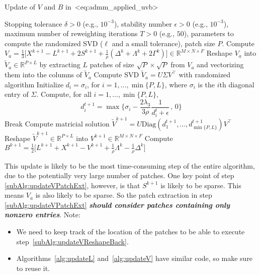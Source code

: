 \documentclass[a4paper,11pt]{article}
\def\eqref#1{<#1>}%
\begin{document}
\begin{algorithm}
  \caption{Update of $V$ and $B$ in~\eqref{eq:admm_applied_uvb}}
  \label{alg:updateV}
  \begin{algorithmic}[1]
  \algrenewcommand{}
  \Require Stopping tolerance $\delta > 0$ (e.g., $10^{-3}$), stability number $\epsilon > 0$ (e.g., $10^{-3}$), maximum number of
  reweighting iterations $T > 0$ (e.g., $50$), parameters to compute the
  randomized SVD ($\ell$ and a small tolerance), patch size $P$.
  \State Compute 
  $ V_a = 
  \frac{1}{3}
  \Big[
    X^{k+1} - L^{k+1}
    +
    2S^{k+1}
    +
  \frac{1}{\rho}(\Delta^k + \Lambda^k + 2\Gamma^{k})\Big]
    \in \mathbb{R}^{M\times N\times F}$
  \State Reshape $V_a$ into $\widetilde{V}_a \in \mathbb{R}^{P \times L}$ by
  extracting $L$ patches of size $\sqrt{P} \times \sqrt{P}$ from $V_a$ and vectorizing
  them into the columns of $\widetilde{V}_a$
  \label{subAlg:updateVPatchExt}
  \State Compute SVD $\widetilde{V}_a = U \Sigma V^\top$ with randomized
  algorithm
  \State Initialize $d_i = \sigma_i$, for $i = 1, \ldots, \min\{P, L\}$, where
  $\sigma_i$ is the $i$th diagonal entry of $\Sigma$.
    \State Compute, for all $i = 1, \ldots, \min\{P, L\}$, 
    $$
    d_i^{t+1} = \max\Big\{\sigma_i - \frac{2\lambda_3}{3 \rho}\frac{1}{d_i^t + \epsilon}\, ,\, 0\Big\}
    $$
      \State Break
    \EndIf
  \EndFor
  \State Compute matricial solution $\widetilde{V}^{k+1} = U
  \text{Diag}(d_1^{t+1}, \ldots, d_{\min\{P, L\}}^{t+1}) V^\top$
  \State Reshape $\widetilde{V}^{k+1} \in \mathbb{R}^{P \times L}$ into
  $V^{k+1} \in \mathbb{R}^{M\times N\times F}$
  \label{subAlg:updateVReshapeBack}
  \State Compute 
  $B^{k+1} = \frac{1}{2}\Big[L^{k+1} + X^{k+1} - V^{k+1} +\frac{1}{\rho}\Lambda^k - \frac{1}{\rho}\Delta^k\Big]$
  \end{algorithmic}
\end{algorithm}

This update is likely to be the most time-consuming step of the entire
algorithm, due to the potentially very large number of patches. One key point
of step \ref{subAlg:updateVPatchExt},
however, is that $S^{k+1}$ is likely to be sparse. This means $V_a$ is also
likely to be sparse. So the patch extraction in step
\ref{subAlg:updateVPatchExt} \textbf{\textit{should consider patches containing only nonzero
entries}}. Note:
\begin{itemize}
  \item We need to keep track of the location of the patches to be able to
    execute step~\ref{subAlg:updateVReshapeBack}.

  \item Algorithms~\ref{alg:updateL} and~\ref{alg:updateV} have similar code,
    so make sure to reuse it.
\end{itemize}
\end{document}
